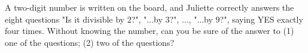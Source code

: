 A two-digit number is written on the board, and Juliette correctly answers the eight questions "Is it divisible by $2$?", "$\dots$by $3$?", $\dots$, "$\dots$by $9$?", saying YES exactly four times. Without knowing the number, can you be sure of the answer to (1) one of the questions; (2) two of the questions?
